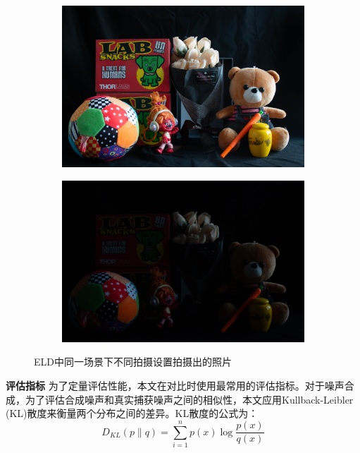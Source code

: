 \begin{figure}[htbp]
	\centering
	\begin{subfigure}{0.49\linewidth}
		\centering
		\includegraphics[width=\linewidth]{imgs/ELD1.jpg}
		
		\label{eld1}%
	\end{subfigure}
	\centering
	\begin{subfigure}{0.49\linewidth}
		\centering
		\includegraphics[width=\linewidth]{imgs/ELD3.jpg}
		
		\label{eld3}%
	\end{subfigure}  
	
	\caption{ELD中同一场景下不同拍摄设置拍摄出的照片}
\end{figure}

\noindent\textbf{评估指标} \quad 为了定量评估性能，本文在对比时使用最常用的评估指标。对于噪声合成，为了评估合成噪声和真实捕获噪声之间的相似性，本文应用Kullback-Leibler (KL)散度来衡量两个分布之间的差异。KL散度的公式为：
\begin{equation}
	D_{K L}(p \| q)=\sum_{i=1}^n p(x) \log \frac{p(x)}{q(x)}
\end{equation}

